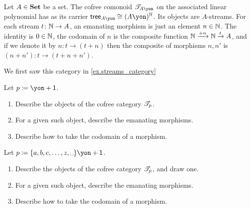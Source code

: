 \documentclass[Book-Poly]{subfiles}
\begin{document}
\begin{example}\label{ex.streams_cofree}
Let $A\in\mathbf{Set}$ be a set. The cofree comonoid $\cofree{A\yon}$ on the associated linear polynomial has as its carrier $\tr_{A\yon}\cong (A\yon)^\nn$. Its objects are $A$-streams. For each stream $t\colon \mathbb{N}\to A$, an emanating morphism is just an element $n\in\mathbb{N}$. The identity is $0\in\mathbb{N}$, the codomain of $n$ is the composite function $\mathbb{N}\xrightarrow{+n}\mathbb{N}\xrightarrow{t}A$, and if we denote it by $n\colon t\to (t+n)$ then the composite of morphisms $n,n'$ is $(n+n')\colon t\to (t+n+n')$.

We first saw this category in \cref{ex.streams_category}
\end{example}

\begin{exercise}
Let $p\coloneqq \yon+\1$.
\begin{enumerate}
	\item Describe the objects of the cofree category $\mathscr{T}_{p}$.
	\item For a given such object, describe the emanating morphisms.
	\item Describe how to take the codomain of a morphism.
\qedhere
\end{enumerate}
\end{exercise}

\begin{exercise}
Let $p\coloneqq \{a,b,c,\ldots,z,\text{\textvisiblespace}\}\yon+\1$.
\begin{enumerate}
	\item Describe the objects of the cofree category $\mathscr{T}_{p}$, and draw one.
	\item For a given such object, describe the emanating morphisms.
	\item Describe how to take the codomain of a morphism.
\qedhere
\end{enumerate}
\end{exercise}
\end{document}
